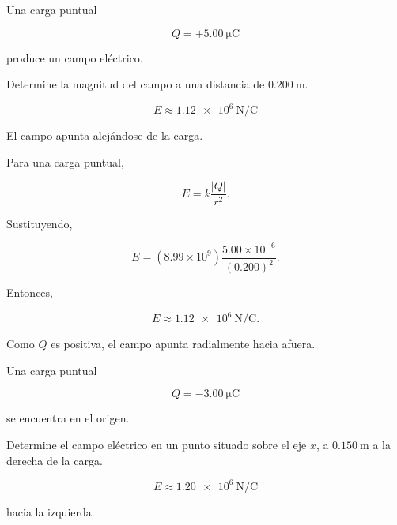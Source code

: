 \begin{ejercicio}

Una carga puntual

\[
Q=+\SI{5.00}{\micro\coulomb}
\]

produce un campo eléctrico.

Determine la magnitud del campo a una distancia de \(\SI{0.200}{\metre}\).

\end{ejercicio}

\begin{respuesta}

\[
\boxed{E\approx\SI{1.12e6}{\newton\per\coulomb}}
\]

El campo apunta alejándose de la carga.

\end{respuesta}

\begin{explicacion}

Para una carga puntual,

\[
E=k\frac{|Q|}{r^2}.
\]

Sustituyendo,

\[
E=(8.99\times10^9)\frac{5.00\times10^{-6}}{(0.200)^2}.
\]

Entonces,

\[
\boxed{E\approx\SI{1.12e6}{\newton\per\coulomb}}.
\]

Como \(Q\) es positiva, el campo apunta radialmente hacia afuera.

\end{explicacion}


\begin{ejercicio}

Una carga puntual

\[
Q=-\SI{3.00}{\micro\coulomb}
\]

se encuentra en el origen.

Determine el campo eléctrico en un punto situado sobre el eje \(x\), a \(\SI{0.150}{\metre}\) a la derecha de la carga.

\end{ejercicio}

\begin{respuesta}

\[
\boxed{E\approx\SI{1.20e6}{\newton\per\coulomb}}
\]

hacia la izquierda.

\end{respuesta}

